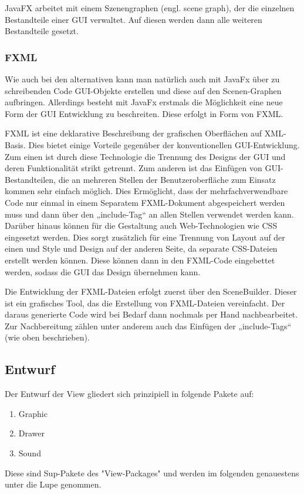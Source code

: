 			JavaFX arbeitet mit einem Szenengraphen (engl. scene graph), der die einzelnen Bestandteile einer GUI verwaltet.
			Auf diesen werden dann alle weiteren Bestandteile gesetzt.
			
			\subsubsection{FXML}
				Wie auch bei den alternativen kann man natürlich auch mit JavaFx über zu schreibenden Code GUI-Objekte erstellen und diese auf den Scenen-Graphen aufbringen.
				Allerdings besteht mit JavaFx erstmals die Möglichkeit eine neue Form der GUI Entwicklung zu beschreiten.
				Diese erfolgt in Form von FXML.
				
				FXML ist eine deklarative Beschreibung der grafischen Oberflächen auf XML-Basis.
				Dies bietet einige Vorteile gegenüber der konventionellen GUI-Entwicklung.
				Zum einen ist durch diese Technologie die Trennung des Designs der GUI und deren Funktionalität strikt getrennt.
				Zum anderen ist das Einfügen von GUI-Bestandteilen, die an mehreren Stellen der Benutzeroberfläche zum Einsatz kommen sehr einfach möglich.
				Dies Ermöglicht, dass der mehrfachverwendbare Code nur einmal in einem Separatem FXML-Dokument abgespeichert werden muss und dann über den „include-Tag“ an allen Stellen verwendet werden kann.
				Darüber hinaus können für die Gestaltung auch Web-Technologien wie CSS eingesetzt werden.
				Dies sorgt zusätzlich für eine Trennung von Layout auf der einen und Style und Design auf der anderen Seite, da separate CSS-Dateien erstellt werden können.
				Diese können dann in den FXML-Code eingebettet werden, sodass die GUI das Design übernehmen kann.
				
				Die Entwicklung der FXML-Dateien erfolgt zuerst über den SceneBuilder.
				Dieser ist ein grafisches Tool, das die Erstellung von FXML-Dateien vereinfacht.
				Der daraus generierte Code wird bei Bedarf dann nochmals per Hand nachbearbeitet.
				Zur Nachbereitung zählen unter anderem auch das Einfügen der „include-Tags“ (wie oben beschrieben).
	
	\subsection{Entwurf}
		Der Entwurf der View gliedert sich prinzipiell in folgende Pakete auf:
			\begin{enumerate}
				\item Graphic
				\item Drawer
				\item Sound
			\end{enumerate}
		Diese sind Sup-Pakete des "View-Packages" und werden im folgenden genauestens unter die Lupe genommen.

